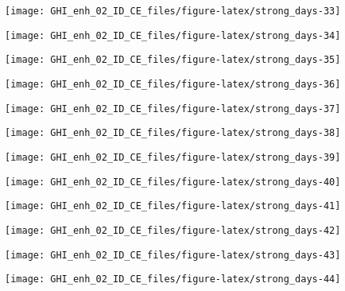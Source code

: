 \documentclass[
  10pt,
  a4paper,oneside]{article}
\begin{document}
\begin{center}\texttt{[image: GHI\_enh\_02\_ID\_CE\_files/figure-latex/strong\_days-33]} \end{center}

\begin{center}\texttt{[image: GHI\_enh\_02\_ID\_CE\_files/figure-latex/strong\_days-34]} \end{center}

\begin{center}\texttt{[image: GHI\_enh\_02\_ID\_CE\_files/figure-latex/strong\_days-35]} \end{center}

\begin{center}\texttt{[image: GHI\_enh\_02\_ID\_CE\_files/figure-latex/strong\_days-36]} \end{center}

\begin{center}\texttt{[image: GHI\_enh\_02\_ID\_CE\_files/figure-latex/strong\_days-37]} \end{center}

\begin{center}\texttt{[image: GHI\_enh\_02\_ID\_CE\_files/figure-latex/strong\_days-38]} \end{center}

\begin{center}\texttt{[image: GHI\_enh\_02\_ID\_CE\_files/figure-latex/strong\_days-39]} \end{center}

\begin{center}\texttt{[image: GHI\_enh\_02\_ID\_CE\_files/figure-latex/strong\_days-40]} \end{center}

\begin{center}\texttt{[image: GHI\_enh\_02\_ID\_CE\_files/figure-latex/strong\_days-41]} \end{center}

\begin{center}\texttt{[image: GHI\_enh\_02\_ID\_CE\_files/figure-latex/strong\_days-42]} \end{center}

\begin{center}\texttt{[image: GHI\_enh\_02\_ID\_CE\_files/figure-latex/strong\_days-43]} \end{center}

\begin{center}\texttt{[image: GHI\_enh\_02\_ID\_CE\_files/figure-latex/strong\_days-44]} \end{center}
\end{document}
